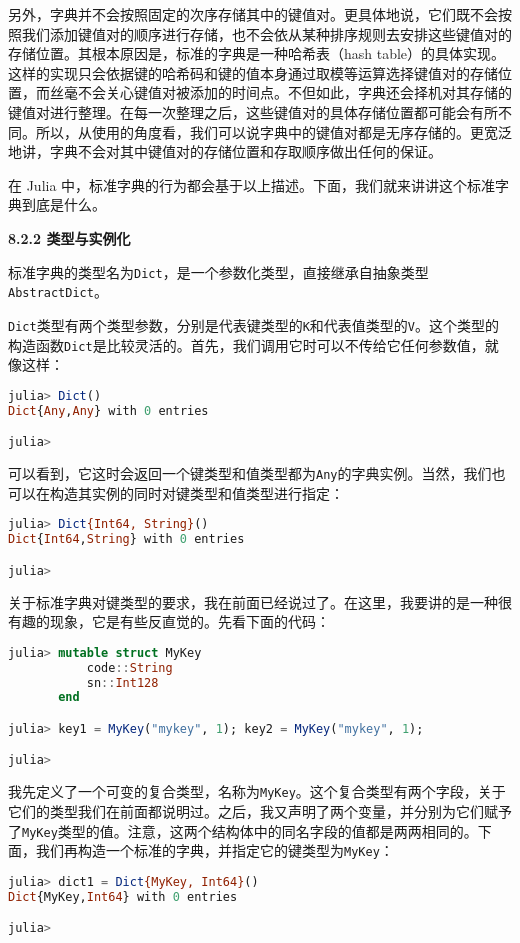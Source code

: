 另外，字典并不会按照固定的次序存储其中的键值对。更具体地说，它们既不会按照我们添加键值对的顺序进行存储，也不会依从某种排序规则去安排这些键值对的存储位置。其根本原因是，标准的字典是一种哈希表（hash table）的具体实现。这样的实现只会依据键的哈希码和键的值本身通过取模等运算选择键值对的存储位置，而丝毫不会关心键值对被添加的时间点。不但如此，字典还会择机对其存储的键值对进行整理。在每一次整理之后，这些键值对的具体存储位置都可能会有所不同。所以，从使用的角度看，我们可以说字典中的键值对都是无序存储的。更宽泛地讲，字典不会对其中键值对的存储位置和存取顺序做出任何的保证。

在 Julia 中，标准字典的行为都会基于以上描述。下面，我们就来讲讲这个标准字典到底是什么。

\textbf{8.2.2 类型与实例化}

标准字典的类型名为\verb`Dict`，是一个参数化类型，直接继承自抽象类型\verb`AbstractDict`。

\verb`Dict`类型有两个类型参数，分别是代表键类型的\verb`K`和代表值类型的\verb`V`。这个类型的构造函数\verb`Dict`是比较灵活的。首先，我们调用它时可以不传给它任何参数值，就像这样：
\begin{lstlisting}[language=julia]
julia> Dict()
Dict{Any,Any} with 0 entries

julia> 
\end{lstlisting}

可以看到，它这时会返回一个键类型和值类型都为\verb`Any`的字典实例。当然，我们也可以在构造其实例的同时对键类型和值类型进行指定：
\begin{lstlisting}[language=julia]
julia> Dict{Int64, String}()
Dict{Int64,String} with 0 entries

julia> 
\end{lstlisting}

关于标准字典对键类型的要求，我在前面已经说过了。在这里，我要讲的是一种很有趣的现象，它是有些反直觉的。先看下面的代码：
\begin{lstlisting}[language=julia]
julia> mutable struct MyKey
           code::String
           sn::Int128
       end

julia> key1 = MyKey("mykey", 1); key2 = MyKey("mykey", 1);

julia> 
\end{lstlisting}

我先定义了一个可变的复合类型，名称为\verb`MyKey`。这个复合类型有两个字段，关于它们的类型我们在前面都说明过。之后，我又声明了两个变量，并分别为它们赋予了\verb`MyKey`类型的值。注意，这两个结构体中的同名字段的值都是两两相同的。下面，我们再构造一个标准的字典，并指定它的键类型为\verb`MyKey`：
\begin{lstlisting}[language=julia]
julia> dict1 = Dict{MyKey, Int64}()
Dict{MyKey,Int64} with 0 entries

julia> 
\end{lstlisting}

